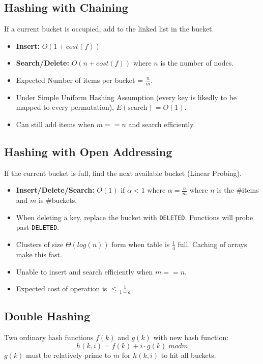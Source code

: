 \documentclass[10pt,landscape,a4paper]{article}
\begin{document}
\begin{multicols*}{4}
\subsection{Hashing with Chaining}
If a current bucket is occupied, add to the linked list in the bucket. 
\begin{itemize}
    \item \textbf{Insert:} $O(1 + cost(f))$ 
    \item \textbf{Search/Delete:} $O(n + cost(f))$ where $n$ is the number of nodes. 
    \item Expected Number of items per bucket = $\frac{n}{m}$. 
    \item Under Simple Uniform Hashing Assumption (every key is likedly to be mapped to every permutation), $E(\text{search}) = O(1)$.
    \item Can still add items when $m == n$ and search efficiently.
\end{itemize}

\subsection{Hashing with Open Addressing}
If the current bucket is full, find the next available bucket (Linear Probing).
\begin{itemize}
    \item \textbf{Insert/Delete/Search:} $O(1)$ if $\alpha < 1$ where $\alpha = \frac{n}{m}$ where $n$ is the \#items and $m$ is \#buckets. 
    \item When deleting a key, replace the bucket with \texttt{DELETED}. Functions will probe past \texttt{DELETED}. 
    \item Clusters of size $\Theta(log(n))$ form when table is $\frac{1}{4}$ full. Caching of arrays make this fast.
    \item Unable to insert and search efficiently when $m == n$.
    \item Expected cost of operation is $\le \frac{1}{1-a}$.
\end{itemize}

\subsection{Double Hashing}
Two ordinary hash functions $f(k)$ and $g(k)$ with new hash function:
\begin{equation*}
    h(k, i) = f(k) + i \cdot g(k) \; mod m
\end{equation*}
$g(k)$ must be relatively prime to $m$ for $h(k, i)$ to hit all buckets.


\end{multicols*}
\end{document}
